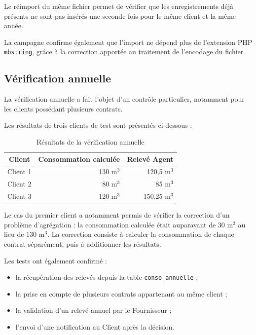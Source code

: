 Le réimport du même fichier permet de vérifier que les enregistrements déjà présents ne sont pas insérés une seconde fois pour le même client et la même année.

La campagne confirme également que l'import ne dépend plus de l'extension PHP \texttt{mbstring}, grâce à la correction apportée au traitement de l'encodage du fichier.

\subsection{Vérification annuelle}

La vérification annuelle a fait l'objet d'un contrôle particulier, notamment pour les clients possédant plusieurs contrats.

Les résultats de trois clients de test sont présentés ci-dessous :

\begin{table}[H]
    \centering
    \caption{Résultats de la vérification annuelle}
    \label{tab:resultats-verification-annuelle}
    \begin{tabular}{|c|r|r|}
        \hline
        \textbf{Client} & \textbf{Consommation calculée} & \textbf{Relevé Agent} \\
        \hline
        Client 1 & 130 m$^3$ & 120,5 m$^3$ \\
        \hline
        Client 2 & 80 m$^3$ & 85 m$^3$ \\
        \hline
        Client 3 & 120 m$^3$ & 150,25 m$^3$ \\
        \hline
    \end{tabular}
\end{table}

Le cas du premier client a notamment permis de vérifier la correction d'un problème d'agrégation : la consommation calculée était auparavant de 30 m$^3$ au lieu de 130 m$^3$. La correction consiste à calculer la consommation de chaque contrat séparément, puis à additionner les résultats.

Les tests ont également confirmé :
\begin{itemize}
    \item la récupération des relevés depuis la table \texttt{conso\_annuelle} ;
    \item la prise en compte de plusieurs contrats appartenant au même client ;
    \item la validation d'un relevé annuel par le Fournisseur ;
    \item l'envoi d'une notification au Client après la décision.
\end{itemize}

